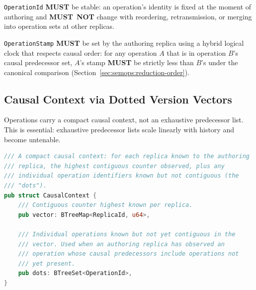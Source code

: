 \documentclass[11pt,letterpaper]{report}
\newcounter{requirement}[chapter]
\newcommand{\MUST}{\textbf{MUST}}
\newcommand{\MUSTNOT}{\textbf{MUST}\nobreak\ \textbf{NOT}}
\begin{document}
\begin{requirement}
  \label{req:semops:operation-stamp-stability}
  \texttt{OperationId} \MUST{} be stable: an operation's identity is
  fixed at the moment of authoring and \MUSTNOT{} change with
  reordering, retransmission, or merging into operation sets at
  other replicas.

  \texttt{OperationStamp} \MUST{} be set by the authoring replica
  using a hybrid logical clock that respects causal order: for any
  operation $A$ that is in operation $B$'s causal predecessor set,
  $A$'s stamp \MUST{} be strictly less than $B$'s under the
  canonical comparison (Section~\ref{sec:semops:reduction-order}).
\end{requirement}

\subsection{Causal Context via Dotted Version Vectors}

Operations carry a compact causal context, not an exhaustive
predecessor list. This is essential: exhaustive predecessor lists
scale linearly with history and become untenable.

\begin{lstlisting}[language=Rust]
/// A compact causal context: for each replica known to the authoring
/// replica, the highest contiguous counter observed, plus any
/// individual operation identifiers known but not contiguous (the
/// "dots").
pub struct CausalContext {
    /// Contiguous counter highest known per replica.
    pub vector: BTreeMap<ReplicaId, u64>,

    /// Individual operations known but not yet contiguous in the
    /// vector. Used when an authoring replica has observed an
    /// operation whose causal predecessors include operations not
    /// yet present.
    pub dots: BTreeSet<OperationId>,
}
\end{lstlisting}
\end{document}
